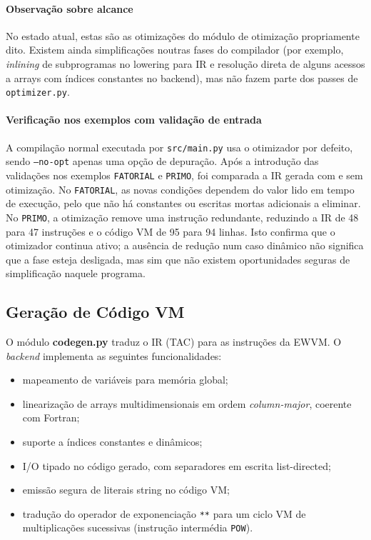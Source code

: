 \documentclass{article}
\begin{document}
\paragraph{Observação sobre alcance}
No estado atual, estas são as otimizações do módulo de otimização propriamente dito.
Existem ainda simplificações noutras fases do compilador (por exemplo, \textit{inlining}
de subprogramas no lowering para IR e resolução direta de alguns acessos a arrays
com índices constantes no backend), mas não fazem parte dos passes de
\texttt{optimizer.py}.

\paragraph{Verificação nos exemplos com validação de entrada}
A compilação normal executada por \texttt{src/main.py} usa o otimizador por defeito, sendo
\texttt{--no-opt} apenas uma opção de depuração. Após a introdução das validações nos exemplos
\texttt{FATORIAL} e \texttt{PRIMO}, foi comparada a IR gerada com e sem otimização. No
\texttt{FATORIAL}, as novas condições dependem do valor lido em tempo de execução, pelo que
não há constantes ou escritas mortas adicionais a eliminar. No \texttt{PRIMO}, a otimização
remove uma instrução redundante, reduzindo a IR de 48 para 47 instruções e o código VM de 95
para 94 linhas. Isto confirma que o otimizador continua ativo; a ausência de redução num caso
dinâmico não significa que a fase esteja desligada, mas sim que não existem oportunidades
seguras de simplificação naquele programa.


\subsection{Geração de Código VM}

O módulo \textbf{codegen.py} traduz o IR (TAC) para as instruções da EWVM. O
\textit{backend} implementa as seguintes funcionalidades:

\begin{itemize}
  \item mapeamento de variáveis para memória global;
  \item linearização de arrays multidimensionais em ordem \textit{column-major}, coerente
  com Fortran;
  \item suporte a índices constantes e dinâmicos;
  \item I/O tipado no código gerado, com separadores em escrita list-directed;
  \item emissão segura de literais string no código VM;
  \item tradução do operador de exponenciação \texttt{**} para um ciclo VM de
  multiplicações sucessivas (instrução intermédia \texttt{POW}).
\end{itemize}
\end{document}
